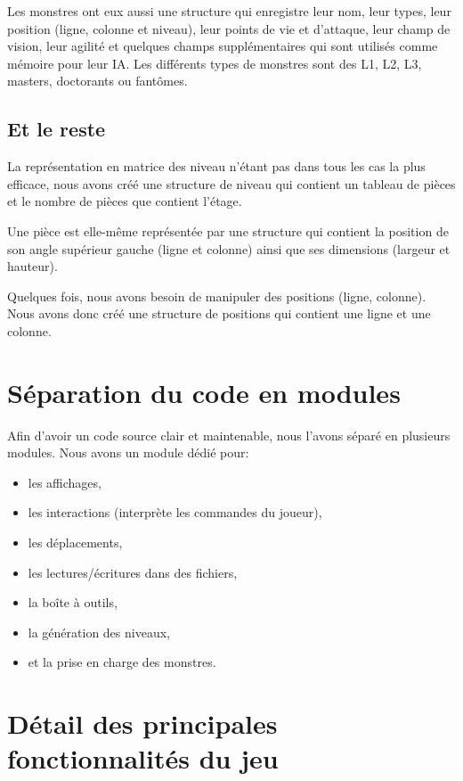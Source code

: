 \documentclass[11pt]{report}
\begin{document}
		Les monstres ont eux aussi une structure qui enregistre leur nom, leur types, leur position (ligne, colonne et niveau), leur points de vie et d'attaque, leur champ de vision, leur agilité et quelques champs supplémentaires qui sont utilisés comme mémoire pour leur IA. Les différents types de monstres sont des L1, L2, L3, masters, doctorants ou fantômes.
		
		\subsection{Et le reste}
		
		La représentation en matrice des niveau n'étant pas dans tous les cas la plus efficace, nous avons créé une structure de niveau qui contient un tableau de pièces et le nombre de pièces que contient l'étage.
		
		Une pièce est elle-même représentée par une structure qui contient la position de son angle supérieur gauche (ligne et colonne) ainsi que ses dimensions (largeur et hauteur).
		
		Quelques fois, nous avons besoin de manipuler des positions (ligne, colonne). Nous avons donc créé une structure de positions qui contient une ligne et une colonne. 
		
	\section{Séparation du code en modules}
	
	Afin d'avoir un code source clair et maintenable, nous l'avons séparé en plusieurs modules. Nous avons un module dédié pour:
	\begin{itemize}
		\item les affichages,
		\item les interactions (interprète les commandes du joueur),
		\item les déplacements, 
		\item les lectures/écritures dans des fichiers,
		\item la boîte à outils,
		\item la génération des niveaux,
		\item et la prise en charge des monstres.
	\end{itemize}
	
	
	\section{Détail des principales fonctionnalités du jeu}
\end{document}
